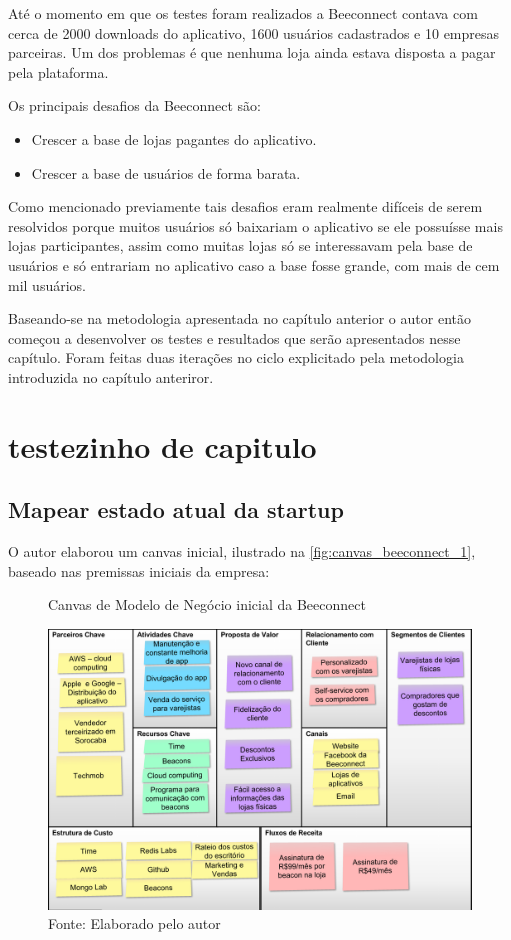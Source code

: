 Até o momento em que os testes foram realizados a Beeconnect contava com cerca de 2000 downloads do aplicativo, 1600 usuários cadastrados e 10 empresas parceiras. Um dos problemas é que nenhuma loja ainda estava disposta a pagar pela plataforma.

Os principais desafios da Beeconnect são:
\begin{itemize}
\item Crescer a base de lojas pagantes do aplicativo.
\item Crescer a base de usuários de forma barata.
\end{itemize}

Como mencionado previamente tais desafios eram realmente difíceis de serem resolvidos porque muitos usuários só baixariam o aplicativo se ele possuísse mais lojas participantes, assim como muitas lojas só se interessavam pela base de usuários e só entrariam no aplicativo caso a base fosse grande, com mais de cem mil usuários.

Baseando-se na metodologia apresentada no capítulo anterior o autor então começou a desenvolver os testes e resultados que serão apresentados nesse capítulo. Foram feitas duas iterações no ciclo explicitado pela metodologia introduzida no capítulo anteriror.
\chapter{testezinho de capitulo}

\section{Mapear estado atual da startup}
\label{cha:mapear_estado}
O autor elaborou um canvas inicial, ilustrado na \autoref{fig:canvas_beeconnect_1}, baseado nas premissas iniciais da empresa: 

\begin{figure}[H]
\caption{Canvas de Modelo de Negócio inicial da Beeconnect}
\centerline{\includegraphics[scale=0.25]{img/canvas_beeconnect_1}}
\label{fig:canvas_beeconnect_1}
\caption* {Fonte: Elaborado pelo autor}
\end{figure}

